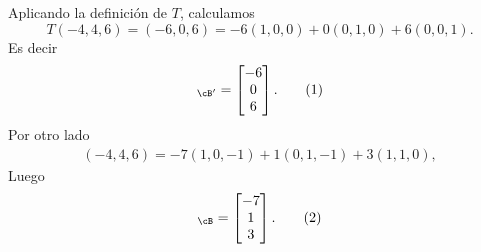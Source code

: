 \documentclass[handout]{beamer} %
\begin{document}
\begin{frame}
	Aplicando la definición de $T$, calculamos
	$$
	T(-4,4,6) = (-6,0,6) = -6(1,0,0) +0(0,1,0) + 6(0,0,1).
	$$
	Es decir 
	\begin{equation*}
		[T(v)]_{\cB'} = \begin{bmatrix}
			-6 \\0\\6
		\end{bmatrix}.\tag{1}
	\end{equation*}
	\pause
	Por otro  lado
	\begin{align*}
		(-4,4,6) = -7(1,0,-1) +1(0,1,-1)+3(1,1,0),
	\end{align*}
	Luego
	\begin{equation*}
		[v]_{\cB} = \begin{bmatrix}
			-7 \\1\\3
		\end{bmatrix}.\tag{2}
	\end{equation*}
\end{frame}


\end{document}

